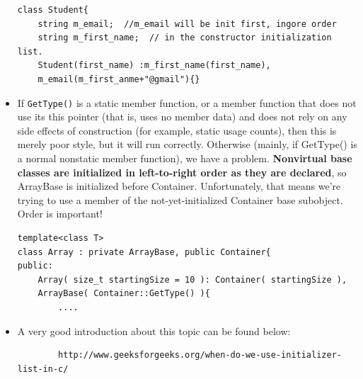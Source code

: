\documentclass[a4paper,11pt,twoside]{book}
\begin{document}
\begin{itemize}
\begin{lstlisting}[numbers=none]
class Student{
	string m_email;  //m_email will be init first, ingore order
	string m_first_name;  // in the constructor initialization list.
	Student(first_name) :m_first_name(first_name),
	m_email(m_first_anme+"@gmail"){}
\end{lstlisting}
		
		
		\item If \texttt{GetType()} is a static member function, or a member function that does not use its this pointer (that is, uses no member data) and does not rely on any side effects of construction (for example, static usage counts), then this is merely poor style, but it will run correctly. Otherwise (mainly, if GetType() is a normal nonstatic member function), we have a problem. \textbf{Nonvirtual base classes are initialized in left-to-right order as they are declared}, so ArrayBase is initialized before Container. Unfortunately, that means we're trying to use a member of the not-yet-initialized Container base subobject. Order is important!
		
\begin{lstlisting}[numbers=none]
template<class T>
class Array : private ArrayBase, public Container{
public:
	Array( size_t startingSize = 10 ): Container( startingSize ), 
	ArrayBase( Container::GetType() ){
		....
\end{lstlisting}
		
    \item A very good introduction about this topic can be found below:	
	\begin{verbatim}
		http://www.geeksforgeeks.org/when-do-we-use-initializer-list-in-c/
	\end{verbatim}

	\end{itemize}
\end{document}

